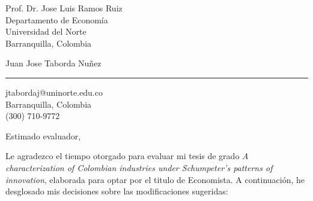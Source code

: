\documentclass[11pt]{letter}
\begin{document}
\begin{letter}{ Prof. Dr. Jose Luis Ramos Ruiz \\
Departamento de Economía \\
Universidad del Norte \\
Barranquilla, Colombia} 

\begin{flushleft}
\large Juan Jose Taborda Nuñez \\ 
\vspace{20pt} \hrule height 1pt 
jtabordaj@uninorte.edu.co \\ Barranquilla, Colombia\\ (300) 710-9772
\end{flushleft} 
\vspace{30pt}

\signature{ Juan Jose Taborda Nuñez \\ Estudiante de Economía} 


\opening{Estimado evaluador,} 

Le agradezco el tiempo otorgado para evaluar mi tesis de grado \textit{A characterization of Colombian industries under Schumpeter's patterns of innovation}, elaborada para optar por el titulo de Economista. A continuación, he desglosado mis decisiones sobre las modificaciones sugeridas:


\end{letter}
\end{document}
